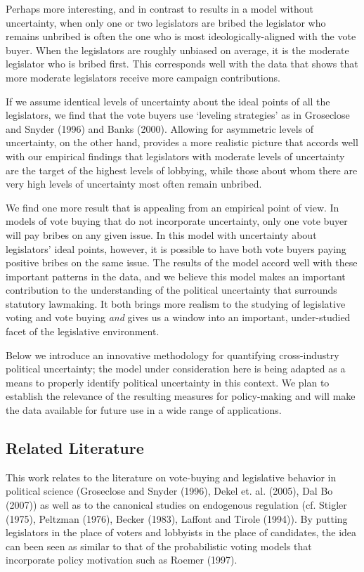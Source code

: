 \documentclass[12pt]{article}
\begin{document}
Perhaps more interesting, and in contrast to results in a model without uncertainty, when only one or two legislators are bribed the legislator who remains unbribed is often the one who is most ideologically-aligned with the vote buyer. When the legislators are roughly unbiased on average, it is the moderate legislator who is bribed first. This corresponds well with the data that shows that more moderate legislators receive more campaign contributions.

If we assume identical levels of uncertainty about the ideal points of all the legislators, we find that the vote buyers use `leveling strategies' as in Groseclose and Snyder (1996) and Banks (2000). Allowing for asymmetric levels of uncertainty, on the other hand, provides a more realistic picture that accords well with our empirical findings that legislators with moderate levels of uncertainty are the target of the highest levels of lobbying, while those about whom there are very high levels of uncertainty most often remain unbribed.

We find one more result that is appealing from an empirical point of view. In models of vote buying that do not incorporate uncertainty, only one vote buyer will pay bribes on any given issue. In this model with uncertainty about legislators' ideal points, however, it is possible to have both vote buyers paying positive bribes on the same issue. The results of the model accord well with these important patterns in the data, and we believe this model makes an important contribution to the understanding of the political uncertainty that surrounds statutory lawmaking. It both brings more realism to the studying of legislative voting and vote buying \textit{and} gives us a window into an important, under-studied facet of the legislative environment.

Below we introduce an innovative methodology for quantifying cross-industry political uncertainty; the model under consideration here is being adapted as a means to properly identify political uncertainty in this context. We plan to establish the relevance of the resulting measures for policy-making and will make the data available for future use in a wide range of applications.

\subsection{Related Literature}
\label{sec:lit}

This work relates to the literature on vote-buying and legislative behavior in political science (Groseclose and Snyder (1996), Dekel et. al. (2005), Dal Bo (2007)) as well as to the canonical studies on endogenous regulation (cf. Stigler (1975), Peltzman (1976), Becker (1983), Laffont and Tirole (1994)).  By putting legislators in the place of voters and lobbyists in the place of candidates, the idea can been seen as similar to that of the probabilistic voting models that incorporate policy motivation such as Roemer (1997).
\end{document}
